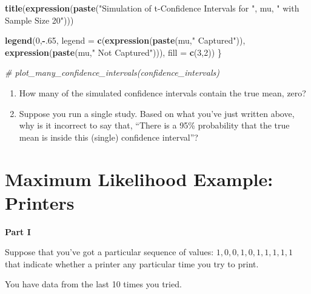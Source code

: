 \documentclass[
]{book}
\newenvironment{Shaded}{\begin{snugshade}}{\end{snugshade}}
\newcommand{\AttributeTok}[1]{\textcolor[rgb]{0.13,0.29,0.53}{#1}}
\newcommand{\CommentTok}[1]{\textcolor[rgb]{0.56,0.35,0.01}{\textit{#1}}}
\newcommand{\DecValTok}[1]{\textcolor[rgb]{0.00,0.00,0.81}{#1}}
\newcommand{\FunctionTok}[1]{\textcolor[rgb]{0.13,0.29,0.53}{\textbf{#1}}}
\newcommand{\NormalTok}[1]{#1}
\newcommand{\SpecialCharTok}[1]{\textcolor[rgb]{0.81,0.36,0.00}{\textbf{#1}}}
\newcommand{\StringTok}[1]{\textcolor[rgb]{0.31,0.60,0.02}{#1}}
\providecommand{\tightlist}{%
  \setlength{\itemsep}{0pt}\setlength{\parskip}{0pt}}
\theoremstyle{definition}
\theoremstyle{definition}
\theoremstyle{definition}
\theoremstyle{definition}
\theoremstyle{remark}
\begin{document}
\begin{Shaded}
\begin{Highlighting}[]
  \FunctionTok{title}\NormalTok{(}\FunctionTok{expression}\NormalTok{(}\FunctionTok{paste}\NormalTok{(}\StringTok{"Simulation of t{-}Confidence Intervals for "}\NormalTok{, mu,}
                          \StringTok{" with Sample Size 20"}\NormalTok{)))}

  \FunctionTok{legend}\NormalTok{(}\DecValTok{0}\NormalTok{,}\SpecialCharTok{{-}}\NormalTok{.}\DecValTok{65}\NormalTok{, }\AttributeTok{legend =} \FunctionTok{c}\NormalTok{(}\FunctionTok{expression}\NormalTok{(}\FunctionTok{paste}\NormalTok{(mu,}\StringTok{" Captured"}\NormalTok{)),}
                             \FunctionTok{expression}\NormalTok{(}\FunctionTok{paste}\NormalTok{(mu,}\StringTok{" Not Captured"}\NormalTok{))), }\AttributeTok{fill =} \FunctionTok{c}\NormalTok{(}\DecValTok{3}\NormalTok{,}\DecValTok{2}\NormalTok{))}
\NormalTok{  \}}
\end{Highlighting}
\end{Shaded}

\begin{Shaded}
\begin{Highlighting}[]
\CommentTok{\# plot\_many\_confidence\_intervals(confidence\_intervals)}
\end{Highlighting}
\end{Shaded}

\begin{enumerate}
\def\labelenumi{\arabic{enumi}.}
\tightlist
\item
  How many of the simulated confidence intervals contain the true mean, zero?\\
\item
  Suppose you run a single study. Based on what you've just written above, why is it incorrect to say that, ``There is a 95\% probability that the true mean is inside this (single) confidence interval''?
\end{enumerate}

\hypertarget{maximum-likelihood-example-printers}{%
\section{Maximum Likelihood Example: Printers}\label{maximum-likelihood-example-printers}}

\textbf{Part I}

Suppose that you've got a particular sequence of values: \({1, 0, 0, 1, 0, 1, 1, 1, 1, 1}\) that indicate whether a printer any particular time you try to print.

You have data from the last 10 times you tried.
\end{document}
